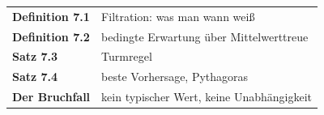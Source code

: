 \begin{merksatz}
\begin{center}
\renewcommand{\arraystretch}{1.5}
\begin{tabular}{@{}P{3.0cm}P{5.6cm}@{}}
\toprule
\textbf{Definition 7.1} & Filtration: was man wann weiß\\
\textbf{Definition 7.2} & bedingte Erwartung über Mittelwerttreue\\
\textbf{Satz 7.3} & Turmregel\\
\textbf{Satz 7.4} & beste Vorhersage, Pythagoras\\
\textbf{Der Bruchfall} & kein typischer Wert, keine Unabhängigkeit\\
\bottomrule
\end{tabular}
\end{center}

\begin{center}
\begin{minipage}{0.88\textwidth}
\end{minipage}
\end{center}
\end{merksatz}

